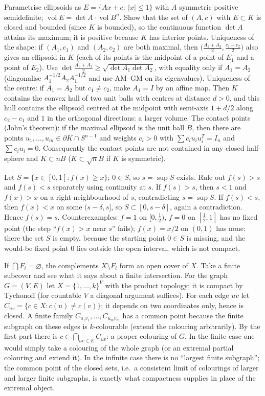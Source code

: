 \documentclass[11pt,a4paper]{article}
\begin{document}
 Parametrise ellipsoids as $E=\{Ax+c:\ |x|\le 1\}$ with $A$ symmetric positive semidefinite; $\operatorname{vol}E=\det A\cdot\operatorname{vol}B^n$. Show that the set of $(A,c)$ with $E\subset K$ is closed and bounded (since $K$ is bounded), so the continuous function $\det A$ attains its maximum; it is positive because $K$ has interior points.
 Uniqueness of the shape: if $(A_1,c_1)$ and $(A_2,c_2)$ are both maximal, then $\bigl(\tfrac{A_1+A_2}{2},\tfrac{c_1+c_2}{2}\bigr)$ also gives an ellipsoid in $K$ (each of its points is the midpoint of a point of $E_1$ and a point of $E_2$). Use $\det\frac{A_1+A_2}{2}\ge\sqrt{\det A_1\det A_2}$, with equality only if $A_1=A_2$ (diagonalise $A_1^{-1/2}A_2A_1^{-1/2}$ and use AM--GM on its eigenvalues).
 Uniqueness of the centre: if $A_1=A_2$ but $c_1\ne c_2$, make $A_1=I$ by an affine map. Then $K$ contains the convex hull of two unit balls with centres at distance $d>0$, and this hull contains the ellipsoid centred at the midpoint with semi-axis $1+d/2$ along $c_2-c_1$ and $1$ in the orthogonal directions: a larger volume.
 The contact points (John's theorem): if the maximal ellipsoid is the unit ball $B$, then there are points $u_1,\dots,u_m\in\partial K\cap S^{n-1}$ and weights $c_i>0$ with $\sum c_iu_iu_i^{T}=I_n$ and $\sum c_iu_i=0$. Consequently the contact points are not contained in any closed half-sphere and $K\subset nB$ ($K\subset\sqrt n B$ if $K$ is symmetric).

 Let $S=\{x\in[0,1]: f(x)\ge x\}$; $0\in S$, so $s=\sup S$ exists. Rule out $f(s)>s$ and $f(s)<s$ separately using continuity at $s$.
 If $f(s)>s$, then $s<1$ and $f(x)>x$ on a right neighbourhood of $s$, contradicting $s=\sup S$. If $f(s)<s$, then $f(x)<x$ on some $(s-\delta,s]$, so $S\subset[0,s-\delta]$, again a contradiction. Hence $f(s)=s$.
 Counterexamples: $f=1$ on $[0,\tfrac12)$, $f=0$ on $[\tfrac12,1]$ has no fixed point (the step ``$f(x)>x$ near $s$'' fails); $f(x)=x/2$ on $(0,1)$ has none: there the set $S$ is empty, because the starting point $0\in S$ is missing, and the would-be fixed point $0$ lies outside the open interval, which is not compact.

 If $\bigcap F_i=\varnothing$, the complements $X\setminus F_i$ form an open cover of $X$. Take a finite subcover and see what it says about a finite intersection.
 For the graph $G=(V,E)$ let $X=\{1,\dots,k\}^V$ with the product topology; it is compact by Tychonoff (for countable $V$ a diagonal argument suffices). For each edge $uv$ let $C_{uv}=\{c\in X: c(u)\ne c(v)\}$; it depends on two coordinates only, hence is closed.
 A finite family $C_{u_1v_1},\dots,C_{u_mv_m}$ has a common point because the finite subgraph on these edges is $k$-colourable (extend the colouring arbitrarily). By the first part there is $c\in\bigcap_{uv\in E}C_{uv}$: a proper colouring of $G$.
 In the finite case one would simply take a colouring of the whole graph (or an extremal partial colouring and extend it). In the infinite case there is no ``largest finite subgraph''; the common point of the closed sets, i.e.\ a consistent limit of colourings of larger and larger finite subgraphs, is exactly what compactness supplies in place of the extremal object.
\end{document}
